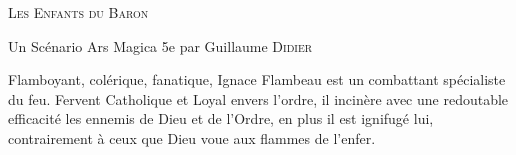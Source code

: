 \begin{center}
\vfill
    {\Large\scshape Les Enfants du Baron\par}
    \vspace{0.5cm}
{Un Scénario Ars Magica 5e par Guillaume \textsc{Didier}\par}
    \vfill
    {\LARGE\bfseries \magusname \par}



\vfill
    \begin{center}
        \parbox{.8\textwidth}{
            Flamboyant, colérique, fanatique, Ignace Flambeau est un combattant spécialiste du feu. Fervent Catholique et Loyal envers l'ordre, il incinère avec une redoutable efficacité les ennemis de Dieu et de l'Ordre, en plus il est ignifugé lui, contrairement à ceux que Dieu voue aux flammes de l'enfer.}
    \end{center}
\vfill
\end{center}
\pagebreak

\shortsheet{}



